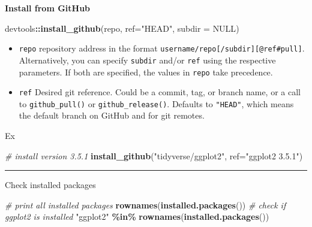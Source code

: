 \documentclass[
]{book}
\newenvironment{Shaded}{\begin{snugshade}}{\end{snugshade}}
\newcommand{\AttributeTok}[1]{\textcolor[rgb]{0.13,0.29,0.53}{#1}}
\newcommand{\CommentTok}[1]{\textcolor[rgb]{0.56,0.35,0.01}{\textit{#1}}}
\newcommand{\ConstantTok}[1]{\textcolor[rgb]{0.56,0.35,0.01}{#1}}
\newcommand{\FunctionTok}[1]{\textcolor[rgb]{0.13,0.29,0.53}{\textbf{#1}}}
\newcommand{\NormalTok}[1]{#1}
\newcommand{\SpecialCharTok}[1]{\textcolor[rgb]{0.81,0.36,0.00}{\textbf{#1}}}
\newcommand{\StringTok}[1]{\textcolor[rgb]{0.31,0.60,0.02}{#1}}
\providecommand{\tightlist}{%
  \setlength{\itemsep}{0pt}\setlength{\parskip}{0pt}}
\theoremstyle{definition}
\theoremstyle{definition}
\theoremstyle{definition}
\theoremstyle{definition}
\theoremstyle{remark}
\begin{document}
\textbf{Install from GitHub}

\begin{Shaded}
\begin{Highlighting}[]
\NormalTok{devtools}\SpecialCharTok{::}\FunctionTok{install\_github}\NormalTok{(repo, }\AttributeTok{ref=}\StringTok{"HEAD"}\NormalTok{, }\AttributeTok{subdir =} \ConstantTok{NULL}\NormalTok{)}
\end{Highlighting}
\end{Shaded}

\begin{itemize}
\tightlist
\item
  \texttt{repo} repository address in the format \texttt{username/repo{[}/subdir{]}{[}@ref\textbar{}\#pull{]}}. Alternatively, you can specify \texttt{subdir} and/or \texttt{ref} using the respective parameters. If both are specified, the values in \texttt{repo} take precedence.
\item
  \texttt{ref} Desired git reference. Could be a commit, tag, or branch name, or a call to \texttt{github\_pull()} or \texttt{github\_release()}. Defaults to \texttt{"HEAD"}, which means the default branch on GitHub and for git remotes.
\end{itemize}

Ex

\begin{Shaded}
\begin{Highlighting}[]
\CommentTok{\# install version 3.5.1}
\FunctionTok{install\_github}\NormalTok{(}\StringTok{"tidyverse/ggplot2"}\NormalTok{, }\AttributeTok{ref=}\StringTok{"ggplot2 3.5.1"}\NormalTok{)}
\end{Highlighting}
\end{Shaded}

\begin{center}\rule{0.5\linewidth}{0.5pt}\end{center}

Check installed packages

\begin{Shaded}
\begin{Highlighting}[]
\CommentTok{\# print all installed packages}
\FunctionTok{rownames}\NormalTok{(}\FunctionTok{installed.packages}\NormalTok{())}
\CommentTok{\# check if \textasciigrave{}ggplot2\textasciigrave{} is installed}
\StringTok{"ggplot2"} \SpecialCharTok{\%in\%} \FunctionTok{rownames}\NormalTok{(}\FunctionTok{installed.packages}\NormalTok{())}
\end{Highlighting}
\end{Shaded}
\end{document}

